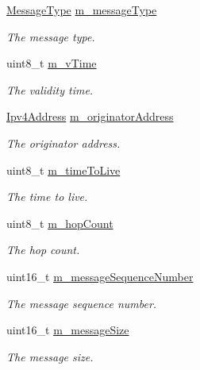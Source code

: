 \begin{DoxyCompactItemize}
\item 
\hyperlink{classns3_1_1olsr_1_1MessageHeader_aff5a31b07c415097a5ada41d53e9a99e}{Message\+Type} \hyperlink{classns3_1_1olsr_1_1MessageHeader_a252a75cd4061df2a1a1b8b4273015ce3}{m\+\_\+message\+Type}
\begin{DoxyCompactList}\small\item\em The message type. \end{DoxyCompactList}\item 
uint8\+\_\+t \hyperlink{classns3_1_1olsr_1_1MessageHeader_a7ca99f2201bea16ad49231673a44d24f}{m\+\_\+v\+Time}
\begin{DoxyCompactList}\small\item\em The validity time. \end{DoxyCompactList}\item 
\hyperlink{classns3_1_1Ipv4Address}{Ipv4\+Address} \hyperlink{classns3_1_1olsr_1_1MessageHeader_a6539ef7254b52fb4f177eff2a87841aa}{m\+\_\+originator\+Address}
\begin{DoxyCompactList}\small\item\em The originator address. \end{DoxyCompactList}\item 
uint8\+\_\+t \hyperlink{classns3_1_1olsr_1_1MessageHeader_a87ed6c82b53777bebefa1179b8de38ba}{m\+\_\+time\+To\+Live}
\begin{DoxyCompactList}\small\item\em The time to live. \end{DoxyCompactList}\item 
uint8\+\_\+t \hyperlink{classns3_1_1olsr_1_1MessageHeader_a5e0ea339a36bbe7bfb7026cf01740ad4}{m\+\_\+hop\+Count}
\begin{DoxyCompactList}\small\item\em The hop count. \end{DoxyCompactList}\item 
uint16\+\_\+t \hyperlink{classns3_1_1olsr_1_1MessageHeader_ae953932c7723f0100c01b1b46bb40ea3}{m\+\_\+message\+Sequence\+Number}
\begin{DoxyCompactList}\small\item\em The message sequence number. \end{DoxyCompactList}\item 
uint16\+\_\+t \hyperlink{classns3_1_1olsr_1_1MessageHeader_ad54621c6bec806636834a721bd68bd95}{m\+\_\+message\+Size}
\begin{DoxyCompactList}\small\item\em The message size. \end{DoxyCompactList}\item 

\end{DoxyCompactItemize}
